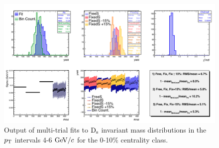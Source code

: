 \begin{figure}[!htb]
 \begin{center}
\includegraphics[width=15.cm]{./FigCap5/MT_Pt46_010.png}
\end{center}
 \caption{Output of multi-trial fits to ${\rm D_s}$ invariant mass distributions in the $p_{\rm T}$ intervals 4-6 $\mathrm{GeV}/c$  for the 0-10$\%$ centrality class.}
 \label{fig:multitrial_Ds_010}
\end{figure}


